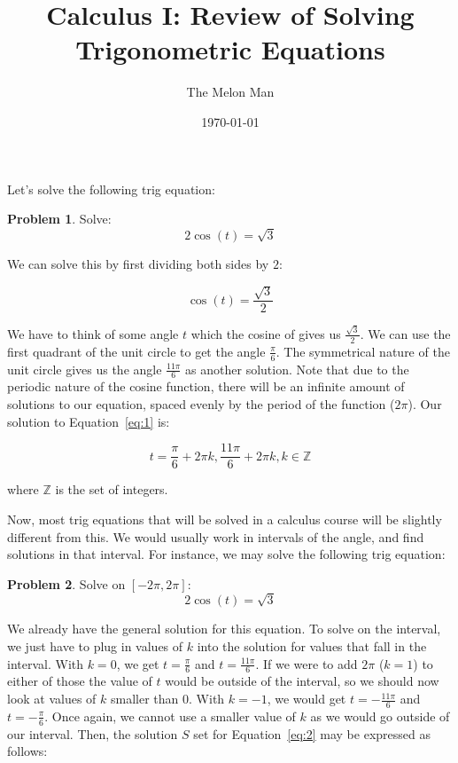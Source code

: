 \documentclass[12pt]{article}
\title{Calculus I: Review of Solving Trigonometric Equations}
\author{The Melon Man}
\date{\today}
\theoremstyle{definition}
\newtheorem{problem}{Problem}
\begin{document}
\maketitle

Let's solve the following trig equation:

\begin{problem}
Solve:
\begin{equation*}
    {2\cos(t) = \sqrt{3}} \label{eq:1}
\end{equation*}
\end{problem}

We can solve this by first dividing both sides by $2$:

\begin{equation}
    \cos(t) = \frac{\sqrt{3}}{2}
\end{equation}

We have to think of some angle $t$ which the cosine of gives us $\frac{\sqrt{3}}{2}$.
We can use the first quadrant of the unit circle to get the angle $\frac{\pi}{6}$.
The symmetrical nature of the unit circle gives us the angle $\frac{11\pi}{6}$ as another solution.
Note that due to the periodic nature of the cosine function, there will be an infinite amount of solutions to our equation, spaced evenly by the period of the function ($2\pi$).
Our solution to Equation~\eqref{eq:1} is:

\begin{equation}
    t = \frac{\pi}{6} + 2\pi k , \frac{11\pi}{6} + 2\pi k, k \in \mathbb{Z}
\end{equation}

where $\mathbb{Z}$ is the set of integers.

Now, most trig equations that will be solved in a calculus course will be slightly different from this.
We would usually work in intervals of the angle, and find solutions in that interval.
For instance, we may solve the following trig equation:


\begin{problem}
Solve on $\displaystyle [-2\pi, 2\pi]$:
\begin{equation*}
    {2\cos(t) = \sqrt{3}} \label{eq:2}
\end{equation*}
\end{problem}

We already have the general solution for this equation.
To solve on the interval, we just have to plug in values of $k$ into the solution for values that fall in the interval.
With $k=0$, we get $t=\frac{\pi}{6}$ and $t=\frac{11\pi}{6}$.
If we were to add $2\pi$ ($k=1$) to either of those the value of $t$ would be outside of the interval, so we should now look at values of $k$ smaller than $0$.
With $k=-1$, we would get $t=-\frac{11\pi}{6}$ and $t=-\frac{\pi}{6}$.
Once again, we cannot use a smaller value of $k$ as we would go outside of our interval.
Then, the solution $S$ set for Equation~\eqref{eq:2} may be expressed as follows:
\end{document}
